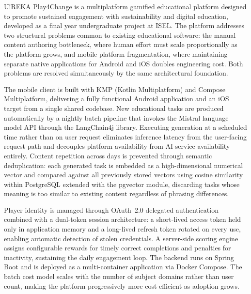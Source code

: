 \abstractEN %

U!REKA Play4Change is a multiplatform gamified educational platform designed to promote sustained engagement with sustainability and digital education, developed as a final year undergraduate project at ISEL. The platform addresses two structural problems common to existing educational software: the manual content authoring bottleneck, where human effort must scale proportionally as the platform grows, and mobile platform fragmentation, where maintaining separate native applications for Android and iOS doubles engineering cost. Both problems are resolved simultaneously by the same architectural foundation.

The mobile client is built with KMP (Kotlin Multiplatform) and Compose Multiplatform, delivering a fully functional Android application and an iOS target from a single shared codebase. New educational tasks are produced automatically by a nightly batch pipeline that invokes the Mistral language model API through the LangChain4j library. Executing generation at a scheduled time rather than on user request eliminates inference latency from the user-facing request path and decouples platform availability from AI service availability entirely. Content repetition across days is prevented through semantic deduplication: each generated task is embedded as a high-dimensional numerical vector and compared against all previously stored vectors using cosine similarity within PostgreSQL extended with the pgvector module, discarding tasks whose meaning is too similar to existing content regardless of phrasing differences.

Player identity is managed through OAuth~2.0 delegated authentication combined with a dual-token session architecture: a short-lived access token held only in application memory and a long-lived refresh token rotated on every use, enabling automatic detection of stolen credentials. A server-side scoring engine assigns configurable rewards for timely correct completions and penalties for inactivity, sustaining the daily engagement loop. The backend runs on Spring Boot and is deployed as a multi-container application via Docker Compose. The batch cost model scales with the number of subject domains rather than user count, making the platform progressively more cost-efficient as adoption grows.

